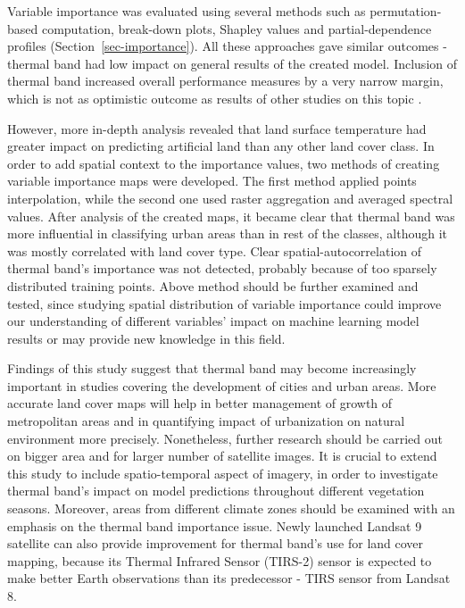 \documentclass{amuthesis}
\begin{document}
Variable importance was evaluated using several methods such as
permutation-based computation, break-down plots, Shapley values and
partial-dependence profiles (Section~\ref{sec-importance}). All these
approaches gave similar outcomes - thermal band had low impact on
general results of the created model. Inclusion of thermal band
increased overall performance measures by a very narrow margin, which is
not as optimistic outcome as results of other studies on this topic
\autocite{rodriguez-galiano_incorporating_2012,zhao_exploring_2019,sun_improvement_2015}.

However, more in-depth analysis revealed that land surface temperature
had greater impact on predicting artificial land than any other land
cover class. In order to add spatial context to the importance values,
two methods of creating variable importance maps were developed. The
first method applied points interpolation, while the second one used
raster aggregation and averaged spectral values. After analysis of the
created maps, it became clear that thermal band was more influential in
classifying urban areas than in rest of the classes, although it was
mostly correlated with land cover type. Clear spatial-autocorrelation of
thermal band's importance was not detected, probably because of too
sparsely distributed training points. Above method should be further
examined and tested, since studying spatial distribution of variable
importance could improve our understanding of different variables'
impact on machine learning model results or may provide new knowledge in
this field.

Findings of this study suggest that thermal band may become increasingly
important in studies covering the development of cities and urban areas.
More accurate land cover maps will help in better management of growth
of metropolitan areas and in quantifying impact of urbanization on
natural environment more precisely. Nonetheless, further research should
be carried out on bigger area and for larger number of satellite images.
It is crucial to extend this study to include spatio-temporal aspect of
imagery, in order to investigate thermal band's impact on model
predictions throughout different vegetation seasons. Moreover, areas
from different climate zones should be examined with an emphasis on the
thermal band importance issue. Newly launched Landsat 9 satellite can
also provide improvement for thermal band's use for land cover mapping,
because its Thermal Infrared Sensor (TIRS-2) sensor is expected to make
better Earth observations than its predecessor - TIRS sensor from
Landsat 8.

\printbibliography[heading=bibintoc, title=Bibliography]
\end{document}
